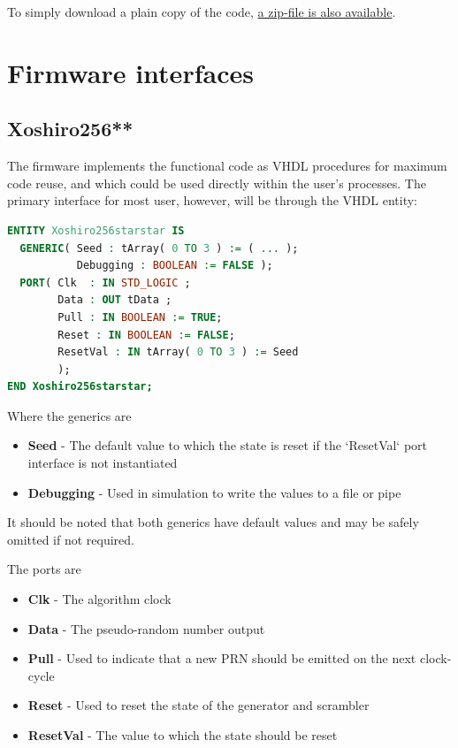 \documentclass{article}
\begin{document}
To simply download a plain copy of the code, \href{https://github.com/Cefhalic/PRNG/archive/refs/heads/main.zip}{a zip-file is also available}.

\section{Firmware interfaces}
\subsection{Xoshiro256**}
The firmware implements the functional code as VHDL procedures for maximum code reuse, and which could be used directly within the user's processes. The primary interface for most user, however, will be through the VHDL entity:

\begin{minipage}{1.0\textwidth}
\centering
\begin{lstlisting}[language=VHDL, label=lst:Xoshiro256starstar_entity]
ENTITY Xoshiro256starstar IS
  GENERIC( Seed : tArray( 0 TO 3 ) := ( ... );
           Debugging : BOOLEAN := FALSE );
  PORT( Clk  : IN STD_LOGIC ;
        Data : OUT tData ;
        Pull : IN BOOLEAN := TRUE;
        Reset : IN BOOLEAN := FALSE;
        ResetVal : IN tArray( 0 TO 3 ) := Seed
        );
END Xoshiro256starstar;
\end{lstlisting}
\end{minipage}

Where the generics are

\begin{itemize}
\item \textbf{Seed} - The default value to which the state is reset if the `ResetVal` port interface is not instantiated
\item \textbf{Debugging} - Used in simulation to write the values to a file or pipe
\end{itemize}

It should be noted that both generics have default values and may be safely omitted if not required.

The ports are 

\begin{itemize}
\item \textbf{Clk} - The algorithm clock
\item \textbf{Data} - The pseudo-random number output
\item \textbf{Pull} - Used to indicate that a new PRN should be emitted on the next clock-cycle
\item \textbf{Reset} - Used to reset the state of the generator and scrambler
\item \textbf{ResetVal} - The value to which the state should be reset
\end{itemize}
\end{document}
